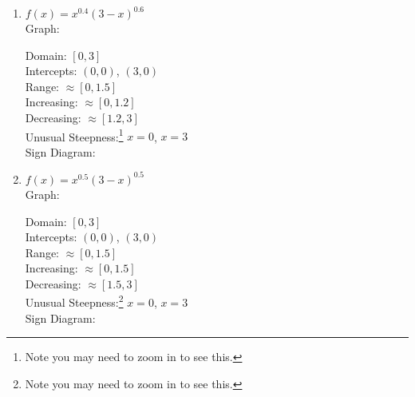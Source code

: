 \documentclass{ximera}
\begin{document}
\begin{enumerate}
\setcounter{enumi}{\value{HW}}

\item \begin{multicols}{2} 
 $f(x) = x^{0.4}(3-x)^{0.6}$ \\
Graph: \\



\vfill
\columnbreak


Domain: $[0,3]$\\
Intercepts: $(0,0)$, $(3,0)$\\
Range: $\approx [0, 1.5]$\\
Increasing: $\approx [0, 1.2]$ \\
Decreasing: $\approx [1.2, 3]$\\
Unusual Steepness:\footnote{Note you may need to zoom in to see this.}  $x=0$, $x = 3$\\
Sign Diagram:\\

\smallskip







\end{multicols}

\item \begin{multicols}{2} 
 $f(x) = x^{0.5}(3-x)^{0.5}$ \\
Graph: \\



\vfill
\columnbreak

Domain: $[0,3]$\\
Intercepts: $(0,0)$, $(3,0)$\\
Range: $\approx [0, 1.5]$\\
Increasing: $\approx [0, 1.5]$ \\
Decreasing: $\approx [1.5, 3]$\\
Unusual Steepness:\footnote{Note you may need to zoom in to see this.}  $x=0$, $x = 3$\\
Sign Diagram:\\

\smallskip



\end{multicols}
\setcounter{HW}{\value{enumi}}
\end{enumerate}
\end{document}
